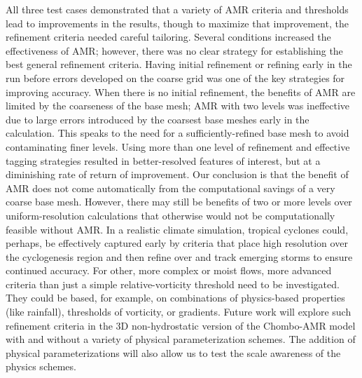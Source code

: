 All three test cases demonstrated that a variety of AMR criteria and
thresholds lead to improvements in the results, though to maximize that
improvement, the refinement criteria needed careful tailoring.  Several
conditions increased the effectiveness of AMR; however, there was no
clear strategy for establishing the best general refinement criteria.
Having initial refinement or refining early in the run before errors
developed on the coarse grid was one of the key strategies for improving
accuracy.  When there is no initial refinement, the benefits of AMR are
limited by the coarseness of the base mesh;  
AMR with two levels was ineffective due to large errors introduced by 
the coarsest base meshes early in the calculation. 
This speaks to the need for a sufficiently-refined base
mesh to avoid contaminating finer levels. 
Using more than one level
of refinement and effective tagging strategies resulted in 
better-resolved features of interest, but at a
diminishing rate of return of improvement. 
Our conclusion is that the
benefit of AMR does not come automatically from the computational 
savings of a very coarse base mesh. However, there may still be benefits 
of two or more levels over uniform-resolution calculations that otherwise 
would not be computationally feasible without AMR.
In a realistic climate simulation,
tropical cyclones could, perhaps, be effectively captured early by
criteria that place high resolution over the cyclogenesis region and then
refine over and track emerging storms to ensure continued accuracy.
For other, more complex or moist flows, more advanced criteria than just
a simple relative-vorticity threshold need to be investigated.  They
could be based, for example, on combinations of physics-based properties (like
rainfall), thresholds of vorticity, or gradients.  Future work will
explore such refinement criteria in the 3D non-hydrostatic version of
the Chombo-AMR model with and without a variety of physical
parameterization schemes.  The addition of physical parameterizations
will also allow us to test the scale awareness of the physics schemes.